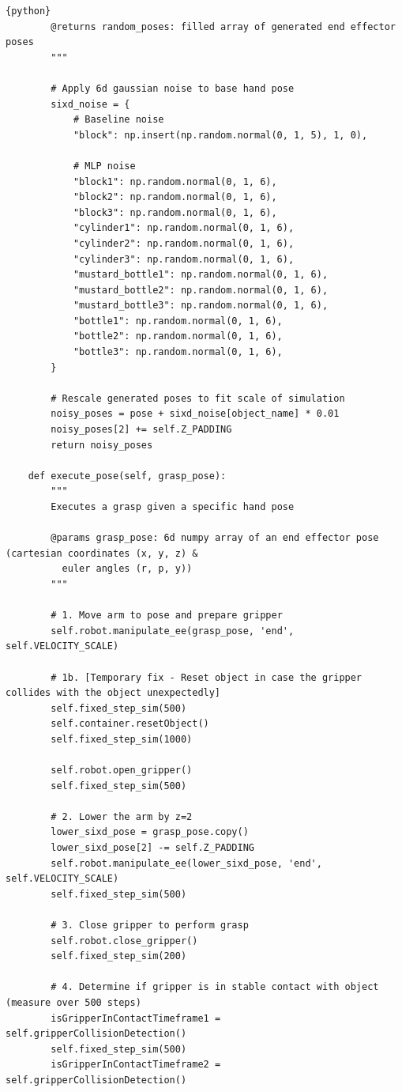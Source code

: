 \documentclass[11pt, a4paper]{report}
\begin{document}
\begin{lstlisting}{python}
        @returns random_poses: filled array of generated end effector poses
        """
        
        # Apply 6d gaussian noise to base hand pose
        sixd_noise = {
            # Baseline noise
            "block": np.insert(np.random.normal(0, 1, 5), 1, 0),

            # MLP noise
            "block1": np.random.normal(0, 1, 6),
            "block2": np.random.normal(0, 1, 6),
            "block3": np.random.normal(0, 1, 6),
            "cylinder1": np.random.normal(0, 1, 6),
            "cylinder2": np.random.normal(0, 1, 6),
            "cylinder3": np.random.normal(0, 1, 6),
            "mustard_bottle1": np.random.normal(0, 1, 6),
            "mustard_bottle2": np.random.normal(0, 1, 6),
            "mustard_bottle3": np.random.normal(0, 1, 6),
            "bottle1": np.random.normal(0, 1, 6),
            "bottle2": np.random.normal(0, 1, 6),
            "bottle3": np.random.normal(0, 1, 6),
        }
        
        # Rescale generated poses to fit scale of simulation
        noisy_poses = pose + sixd_noise[object_name] * 0.01
        noisy_poses[2] += self.Z_PADDING
        return noisy_poses
    
    def execute_pose(self, grasp_pose):
        """
        Executes a grasp given a specific hand pose

        @params grasp_pose: 6d numpy array of an end effector pose (cartesian coordinates (x, y, z) &
          euler angles (r, p, y))
        """

        # 1. Move arm to pose and prepare gripper
        self.robot.manipulate_ee(grasp_pose, 'end', self.VELOCITY_SCALE)

        # 1b. [Temporary fix - Reset object in case the gripper collides with the object unexpectedly]
        self.fixed_step_sim(500)
        self.container.resetObject()
        self.fixed_step_sim(1000)

        self.robot.open_gripper()
        self.fixed_step_sim(500)

        # 2. Lower the arm by z=2
        lower_sixd_pose = grasp_pose.copy()
        lower_sixd_pose[2] -= self.Z_PADDING
        self.robot.manipulate_ee(lower_sixd_pose, 'end', self.VELOCITY_SCALE)
        self.fixed_step_sim(500)

        # 3. Close gripper to perform grasp
        self.robot.close_gripper()
        self.fixed_step_sim(200)

        # 4. Determine if gripper is in stable contact with object (measure over 500 steps)
        isGripperInContactTimeframe1 = self.gripperCollisionDetection()
        self.fixed_step_sim(500)
        isGripperInContactTimeframe2 = self.gripperCollisionDetection()


\end{lstlisting}
\end{document}
